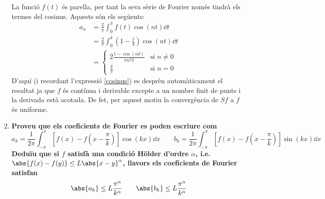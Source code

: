 \documentclass[10pt,a4paper]{article}
\theoremstyle{definition}
\begin{document}
\begin{enumerate}
        La funció $f(t)$ és parella, per tant la seva sèrie de Fourier només tindrà els termes del cosinus. Aquests són els següents:
        \begin{align*}
          a_n & =\frac{2}{\pi}\int_0^\pi f(t)\cos(nt)\dd{t}                                \\
              & =\frac{2}{\pi}\int_0^\delta \left(1-\frac{t}{\delta}\right)\cos(nt)\dd{t}  \\
              & =\begin{cases}
                   \displaystyle 2\frac{1-\cos(n\delta)}{\pi n^2\delta} & \text{si $n\ne 0$} \\
                   \frac{\delta}{\pi}                                   & \text{si $n=0$}
                 \end{cases}
        \end{align*}
        D'aquí (i recordant l'expressió \eqref{cosinus}) es desprèn automàticament el resultat ja que $f$ és contínua i derivable excepte a un nombre finit de punts i la derivada està acotada. De fet, per aquest motiu la convergència de $Sf$ a $f$ és uniforme.
  \item \textbf{Proveu que els coeficients de Fourier es poden escriure com $$a_k=\frac{1}{2\pi}\int_{-\pi}^\pi\left[f(x)-f\left(x-\frac{\pi}{k}\right)\right]\cos(kx)\dd{x}\qquad b_k=\frac{1}{2\pi}\int_{-\pi}^\pi\left[f(x)-f\left(x-\frac{\pi}{k}\right)\right]\sin(kx)\dd{x}$$
          Deduïu que si $f$ satisfà una condició Hölder d'ordre $\alpha$, i.e. $\abs{f(x)-f(y)}\leq L\abs{x-y}^\alpha$, llavors els coeficients de Fourier satisfan $$\abs{a_k}\leq L\frac{\pi^\alpha}{k^\alpha}\qquad\abs{b_k}\leq L\frac{\pi^\alpha}{k^\alpha}$$}


\end{enumerate}
\end{document}
